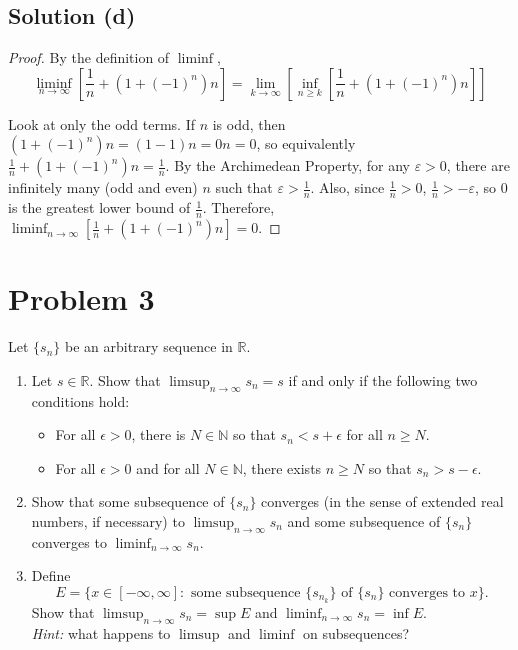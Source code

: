 \documentclass[11pt]{article}
\begin{document}
    \subsection{Solution (d)}
        \begin{proof}
            By the definition of $\liminf$, 
            \[ \liminf_{n \to \infty} \left[\frac{1}{n} + (1 + (-1)^n)n\right] = \lim_{k \to \infty} \left[ \inf_{n \geq k} \left[\frac{1}{n} + (1 + (-1)^n)n\right] \right] \]

            Look at only the odd terms.
            If $n$ is odd, then $(1 + (-1)^n)n = (1 - 1)n = 0n = 0$, so equivalently $\frac{1}{n} + (1 + (-1)^n)n = \frac{1}{n}$.
            By the Archimedean Property, for any $\varepsilon > 0$, there are infinitely many (odd and even) $n$ such that $\varepsilon > \frac{1}{n}$.
            Also, since $\frac{1}{n} > 0$, $\frac{1}{n} > -\varepsilon$, so $0$ is the greatest lower bound of $\frac{1}{n}$.
            Therefore, $\liminf_{n \to \infty} \left[\frac{1}{n} + (1 + (-1)^n)n\right] = 0$.
        \end{proof}

\pagebreak
\section{Problem 3}
    Let $\{s_n\}$ be an arbitrary sequence in $\mathbb{R}$.
    \begin{enumerate}[label=(\alph*)]
        \item 
        Let $s \in \mathbb{R}$. Show that $\displaystyle{\limsup_{n \to \infty} s_n = s}$ if and only if the following two conditions hold:
        \begin{itemize}
            \item 
            For all $\epsilon > 0$, there is $N \in \mathbb{N}$ so that $s_n < s + \epsilon$ for all $n \geq N$.

            \item 
            For all $\epsilon > 0$ and for all $N \in \mathbb{N}$, there exists $n \geq N$ so that $s_n > s - \epsilon$.
        \end{itemize}
        
        \item 
        Show that some subsequence of $\{s_n\}$ converges (in the sense of extended real numbers, if necessary) to $\displaystyle{\limsup_{n \to \infty} s_n}$ and some subsequence of $\{s_n\}$ converges to $\displaystyle{\liminf_{n \to \infty} s_n}$.

        \item 
        Define
        \begin{equation*}
            E = \{x \in [-\infty, \infty] : \text{ some subsequence } \{s_{n_k}\} \text{ of } \{s_n\} \text{ converges to } x\}.
        \end{equation*}
        Show that $\displaystyle{\limsup_{n \to \infty} s_n = \sup E}$ and $\displaystyle{\liminf_{n \to \infty} s_n = \inf E}$.\\[5pt] \textit{Hint:} what happens to $\limsup$ and $\liminf$ on subsequences?\\
        
    \end{enumerate}
\end{document}
